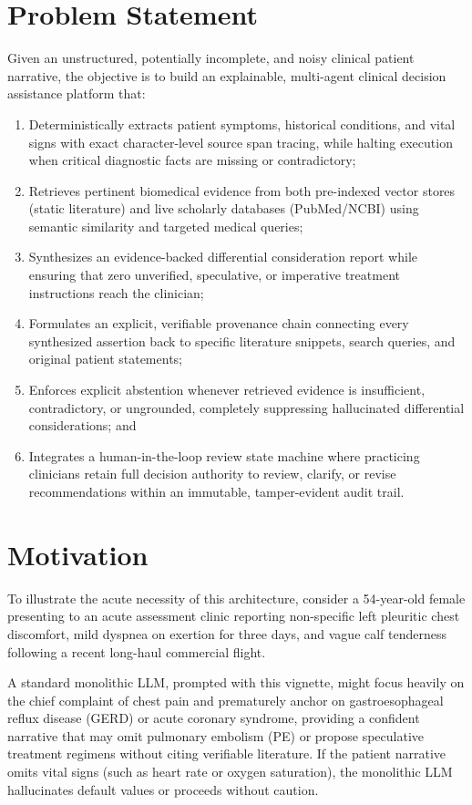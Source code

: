\documentclass[12pt,a4paper]{report}
\begin{document}
\section{Problem Statement}
Given an unstructured, potentially incomplete, and noisy clinical patient narrative, the objective is to build an explainable, multi-agent clinical decision assistance platform that:
\begin{enumerate}
    \item Deterministically extracts patient symptoms, historical conditions, and vital signs with exact character-level source span tracing, while halting execution when critical diagnostic facts are missing or contradictory;
    \item Retrieves pertinent biomedical evidence from both pre-indexed vector stores (static literature) and live scholarly databases (PubMed/NCBI) using semantic similarity and targeted medical queries;
    \item Synthesizes an evidence-backed differential consideration report while ensuring that zero unverified, speculative, or imperative treatment instructions reach the clinician;
    \item Formulates an explicit, verifiable provenance chain connecting every synthesized assertion back to specific literature snippets, search queries, and original patient statements;
    \item Enforces explicit abstention whenever retrieved evidence is insufficient, contradictory, or ungrounded, completely suppressing hallucinated differential considerations; and
    \item Integrates a human-in-the-loop review state machine where practicing clinicians retain full decision authority to review, clarify, or revise recommendations within an immutable, tamper-evident audit trail.
\end{enumerate}

\section{Motivation}
To illustrate the acute necessity of this architecture, consider a 54-year-old female presenting to an acute assessment clinic reporting non-specific left pleuritic chest discomfort, mild dyspnea on exertion for three days, and vague calf tenderness following a recent long-haul commercial flight. 

A standard monolithic LLM, prompted with this vignette, might focus heavily on the chief complaint of chest pain and prematurely anchor on gastroesophageal reflux disease (GERD) or acute coronary syndrome, providing a confident narrative that may omit pulmonary embolism (PE) or propose speculative treatment regimens without citing verifiable literature. If the patient narrative omits vital signs (such as heart rate or oxygen saturation), the monolithic LLM hallucinates default values or proceeds without caution.
\end{document}
